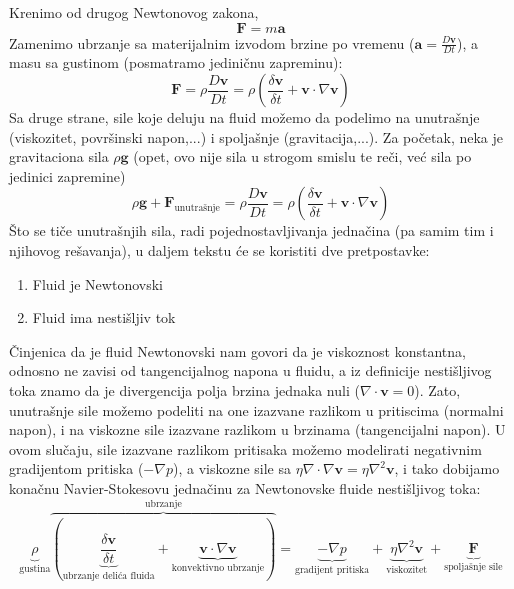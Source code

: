 \documentclass[12pt]{article}
\renewcommand{\vec}[1]{\mathbf{#1}}
\begin{document}
        Krenimo od drugog Newtonovog zakona,
        \begin{equation}\label{eq:Newtonov 2. zakon}
            \vec{F}=m\vec{a}
        \end{equation}
        Zamenimo ubrzanje sa materijalnim izvodom brzine po vremenu ($\vec{a} = \frac{D\vec{v}}{Dt}$), a masu sa gustinom (posmatramo jedini\v cnu zapreminu):
        \begin{equation}\label{eq:Navier-Stokes izvodjenje 1}
            \vec{F}=\rho\frac{D\vec{v}}{Dt}=\rho(\frac{\delta \vec{v}}{\delta t} + \vec{v} \cdot \nabla \vec{v})
        \end{equation}
        Sa druge strane, sile koje deluju na fluid mo\v zemo da podelimo na unutra\v snje (viskozitet, povr\v sinski napon,...) i spolja\v snje (gravitacija,...). Za po\v cetak, neka je gravitaciona sila $\rho \vec{g}$ (opet, ovo nije sila u strogom smislu te re\v ci, ve\'c sila po jedinici zapremine)
        \begin{equation}\label{eq:Navier-Stokes izvodjenje 2}
            \rho \vec{g} + \vec{F}_{\text{unutra\v snje}}=\rho\frac{D\vec{v}}{Dt}=\rho(\frac{\delta \vec{v}}{\delta t} + \vec{v} \cdot \nabla \vec{v})
        \end{equation}
        \v Sto se ti\v ce unutra\v snjih sila, radi pojednostavljivanja jedna\v cina (pa samim tim i njihovog re\v savanja), u daljem tekstu \'ce se koristiti dve pretpostavke:
        \begin{enumerate}
          \item Fluid je Newtonovski
          \item Fluid ima nesti\v sljiv tok
        \end{enumerate}
        \v Cinjenica da je fluid Newtonovski nam govori da je viskoznost konstantna, odnosno ne zavisi od tangencijalnog napona u fluidu, a iz definicije nesti\v sljivog toka znamo da je divergencija polja brzina jednaka nuli ($\nabla \cdot \vec v = 0$). Zato, unutra\v snje sile mo\v zemo podeliti na one izazvane razlikom u pritiscima (normalni napon), i na viskozne sile izazvane razlikom u brzinama (tangencijalni napon)\cite{particle-fluids}. U ovom slu\v caju, sile izazvane razlikom pritisaka mo\v zemo modelirati negativnim gradijentom pritiska ($-\nabla p$), a viskozne sile sa $\eta\nabla\cdot\nabla\vec{v}=\eta\nabla^2\vec{v}$, i tako dobijamo kona\v cnu Navier-Stokesovu jedna\v cinu za Newtonovske fluide nesti\v sljivog toka:
        \begin{equation}\label{eq:Navier-Stokes za nn fluide}
         \underbrace{\rho}_{\text{gustina}} \overbrace{(\underbrace{\frac{\delta \vec{v}}{\delta t}}_{\text{ubrzanje deli\'ca fluida}} + \underbrace{\vec{v} \cdot \nabla \vec{v}}_{\text{konvektivno ubrzanje}})}^{\text{ubrzanje}} = \underbrace{-\nabla p}_{\text{gradijent pritiska}} + \underbrace{\eta\nabla^2\vec{v}}_{\text{viskozitet}} + \underbrace{\vec{F}}_{\text{spolja\v snje sile}}
        \end{equation}
\end{document}
